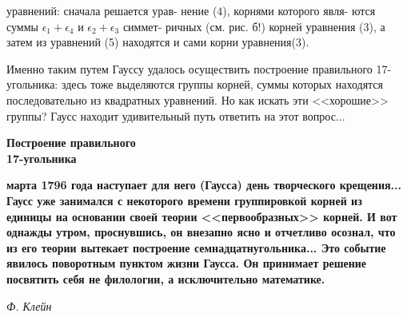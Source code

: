 \setlength{\columnsep}{32pt}
\begin{multicols}{2}
\noindent
уравнений: сначала решается урав- нение (4), корнями которого явля- ются суммы $\epsilon_1+\epsilon_4$ и $\epsilon_2 +\epsilon_3$ симмет- ричных (см. рис. б!) корней уравнения (3), а затем из уравнений (5) находятся и сами корни уравнения(3).\par
Именно таким путем Гауссу удалось осуществить построение правильного 17-угольника: здесь тоже выделяются группы корней, суммы которых находятся последовательно из квадратных уравнений. Но как искать эти <<хорошие>> группы?  Гаусс находит удивительный путь ответить на этот вопрос...\par
\begin{center}
    \textbf{Построение правильного\\
        17-угольника}
\end{center}
\begin{adjustwidth}{1cm}{0cm}
    \scriptsize\textbf{ марта 1796 года наступает для него (Гаусса) день творческого крещения... Гаусс уже занимался с некоторого времени группировкой корней из единицы на основании своей теории <<первообразных>> корней. И вот однажды утром, проснувшись, он внезапно ясно и отчетливо осознал, что из его теории вытекает построение семнадцатнугольника... Это событие явилось поворотным пунктом жизни Гаусса. Он принимает решение посвятить себя не филологии, а исключительно математике.}
\end{adjustwidth}
\begin{flushright}    
    \scriptsize\textit{Ф. Клейн}\par
\end{flushright}


\end{multicols}
